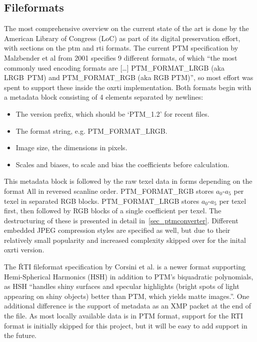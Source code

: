 \subsection{Fileformats}\label{sec_relfile}
The most comprehensive overview on the current state of the art is done by the
American Library of Congress (LoC) as part of its digital preservation effort, with
sections on the ptm\cite{library_of_congress_polynomial_2018} and
rti\cite{library_of_congress_reflectance_2018} formats. The current PTM
specification by Malzbender et al\cite*{malzbender_polynomial_2001} from 2001 specifies 9
different formats, of which ``the most commonly used encoding formats are
[\ldots] PTM\_FORMAT\_LRGB (aka LRGB\ PTM) and
PTM\_FORMAT\_RGB (aka RGB PTM)''\cite{library_of_congress_polynomial_2018}, so most effort was
spent to support these inside the oxrti implementation. Both formats begin with
a metadata block consisting of 4 elements separated by newlines:
\begin{itemize}
\item The version prefix, which should be `PTM\_1.2' for recent files.
\item The format string, e.g. PTM\_FORMAT\_LRGB.
\item Image size, the dimensions in pixels.
\item Scales and biases, to scale and bias the coefficients before calculation.
\end{itemize}
This metadata block is followed by the raw texel data in forms depending on the
format All in reversed scanline order. PTM\_FORMAT\_RGB stores $a_{0}$-$a_{5}$ per
texel in separated RGB blocks. PTM\_FORMAT\_LRGB stores $a_{0}$-$a_{5}$ per texel
first, then followed by RGB blocks of a single coefficient per texel. The
destructuring of these is presented in detail in~\autoref{sec_ptmconverter}. Different
embedded JPEG compression styles are specified as well, but due to their
relatively small popularity and increased complexity skipped over for the inital
oxrti version.

The \.RTI fileformat specification by Corsini et al.\cite*{corsini_rti_2010} is a
newer format supporting Hemi-Spherical Harmonics (HSH) in addition to PTM's
biquadratic polynomials, as HSH ``handles shiny surfaces and specular
highlights (bright spots of light appearing on shiny objects) better than PTM,
which yields matte images.''\cite*{library_of_congress_reflectance_2018}. One
additional difference is the support of metadata as an XMP packet at the end of
the file. As most locally available data is in PTM format, support for the RTI
format is initially skipped for this project, but it will be easy to add support
in the future.

